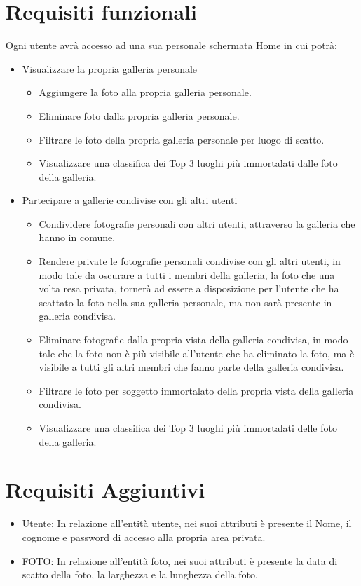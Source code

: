 \section{Requisiti funzionali}
Ogni utente avrà accesso ad una sua personale schermata Home in cui potrà:
\begin{itemize}
    \item Visualizzare la propria galleria personale
        \begin{itemize}
            \item Aggiungere la foto alla propria galleria personale.
            \item Eliminare foto dalla propria galleria personale.
            \item Filtrare le foto della propria galleria personale per luogo di scatto.
            \item Visualizzare una classifica dei Top 3 luoghi più immortalati dalle foto della galleria.
        \end{itemize}
    \item Partecipare a gallerie condivise con gli altri utenti
        \begin{itemize}
            \item Condividere fotografie personali con altri utenti, attraverso la galleria che hanno in comune.
            \item Rendere private le fotografie personali condivise con gli altri utenti, in modo tale da oscurare a tutti i membri della galleria, la foto che una volta resa privata, tornerà ad essere a disposizione per l’utente che ha scattato la foto nella sua galleria personale, ma non sarà presente in galleria condivisa.
            \item Eliminare fotografie dalla propria vista della galleria condivisa, in modo tale che la foto non è più visibile all’utente che ha eliminato la foto, ma è visibile a tutti gli altri membri che fanno parte della galleria condivisa.
            \item Filtrare le foto per soggetto immortalato della propria vista della galleria condivisa.
            \item Visualizzare una classifica dei Top 3 luoghi più immortalati delle foto della galleria.
        \end{itemize}
\end{itemize}

\section{Requisiti Aggiuntivi}
\begin{itemize}
    \item Utente: In relazione all’entità utente, nei suoi attributi è presente il Nome, il cognome e password di accesso alla propria area privata.
    \item FOTO: In relazione all’entità foto, nei suoi attributi è presente la data di scatto della foto, la larghezza e la lunghezza della foto.
\end{itemize}